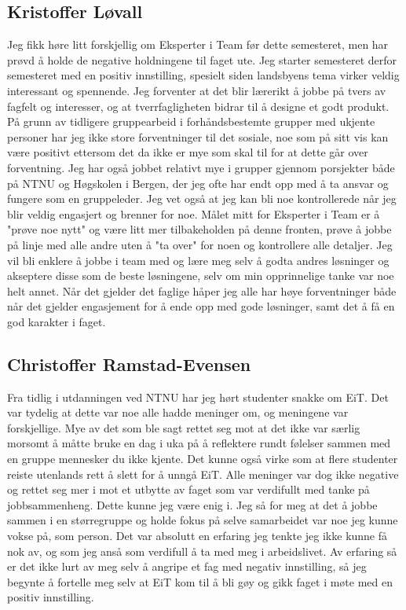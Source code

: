 \subsection*{Kristoffer Løvall}
Jeg fikk høre litt forskjellig om Eksperter i Team før dette semesteret, men har 
prøvd å holde de negative holdningene til faget ute. Jeg starter semesteret 
derfor semesteret med en positiv innstilling, spesielt siden landsbyens tema 
virker veldig interessant og spennende. Jeg forventer at det blir lærerikt å 
jobbe på tvers av fagfelt og interesser, og at tverrfagligheten bidrar til å 
designe et godt produkt. På grunn av tidligere gruppearbeid i forhåndsbestemte 
grupper med ukjente personer har jeg ikke store forventninger til det sosiale, 
noe som på sitt vis kan være positivt ettersom det da ikke er mye som skal til 
for at dette går over forventning. Jeg har også jobbet relativt mye i grupper 
gjennom porsjekter både på NTNU og Høgskolen i Bergen, der jeg ofte har endt opp 
med å ta ansvar og fungere som en gruppeleder. Jeg vet også at jeg kan bli noe 
kontrollerede når jeg blir veldig engasjert og brenner for noe.  Målet mitt for 
Eksperter i Team er å "prøve noe nytt" og være litt mer tilbakeholden på denne 
fronten, prøve å jobbe på linje med alle andre uten å "ta over" for noen og 
kontrollere alle detaljer. Jeg vil bli enklere å jobbe i team med og lære meg 
selv å godta andres løsninger og akseptere disse som de beste løsningene, selv om 
min opprinnelige tanke var noe helt annet. Når det gjelder det faglige håper jeg 
alle har høye forventninger både når det gjelder engasjement for å ende opp med 
gode løsninger, samt det å få en god karakter i faget.

\subsection*{Christoffer Ramstad-Evensen}
Fra tidlig i utdanningen ved NTNU har jeg hørt studenter snakke om EiT. Det var tydelig at dette var noe alle hadde 
meninger om, og meningene var forskjellige. Mye av det som ble sagt rettet seg mot at det ikke var særlig morsomt 
å måtte bruke en dag i uka på å reflektere rundt følelser sammen med en gruppe mennesker du ikke kjente. Det 
kunne også virke som at flere studenter reiste utenlands rett å slett for å unngå EiT. Alle meninger var dog ikke 
negative og rettet seg mer i mot et utbytte av faget som var verdifullt med tanke på jobbsammenheng. Dette kunne 
jeg være enig i. Jeg så for meg at det å jobbe sammen i en størregruppe og holde fokus på selve samarbeidet var 
noe jeg kunne vokse på, som person. Det var absolutt en erfaring jeg tenkte jeg ikke kunne få nok av, og som jeg 
anså som verdifull å ta med meg i arbeidslivet. Av erfaring så er det ikke lurt av meg selv å angripe et fag med 
negativ innstilling, så jeg begynte å fortelle meg selv at EiT kom til å bli gøy og gikk faget i møte med en positiv 
innstilling.


